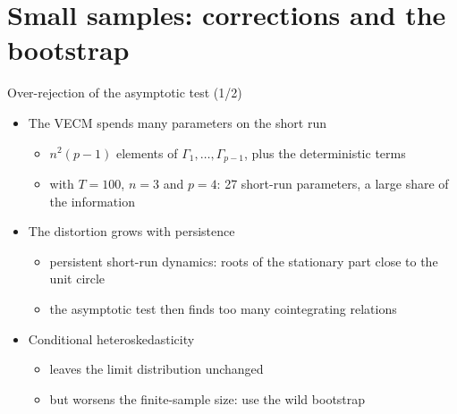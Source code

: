 \section{Small samples: corrections and the bootstrap}

\begin{frame}{Over-rejection of the asymptotic test (1/2)}
\itemsize{\small}
\begin{itemize}
    \item The VECM spends many parameters on the short run
    \begin{itemize}
        \item $n^2(p - 1)$ elements of $\Gamma_1, \dots, \Gamma_{p-1}$, plus the deterministic terms
        \item with $T = 100$, $n = 3$ and $p = 4$: 27 short-run parameters, a large share of the information
    \end{itemize}
    \item The distortion grows with persistence
    \begin{itemize}
        \item persistent short-run dynamics: roots of the stationary part close to the unit circle
        \item the asymptotic test then finds too many cointegrating relations
    \end{itemize}
    \item Conditional heteroskedasticity 
    \begin{itemize}
        \item leaves the limit distribution unchanged
        \item but worsens the finite-sample size: use the wild bootstrap
    \end{itemize}
\end{itemize}
\end{frame}

